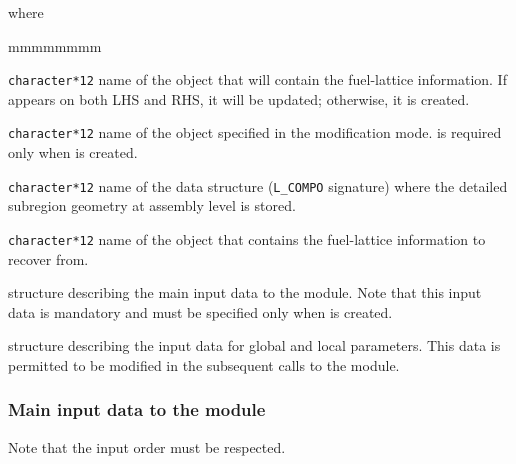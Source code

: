 \noindent where
\begin{ListeDeDescription}{mmmmmmmm}

\item[\dusa{FLMAP}] \texttt{character*12} name of the  object
that will contain the fuel-lattice information. If  appears on
both LHS and RHS, it will be updated; otherwise, it is created.

\item[\dusa{MATEX}] \texttt{character*12} name of the  object
specified in the modification mode.  is required
only when  is created.

\item[\dusa{COMPO}] {\tt character*12} name of the  data
structure ({\tt L\_COMPO} signature) where the detailed subregion geometry at assembly level is stored.

\item[\dusa{FLMAP2}] \texttt{character*12} name of the  object
that contains the fuel-lattice information to recover from.

\item[\dstr{descresini1}] structure describing the main input data to
the  module. Note that this input data is mandatory and
must be specified only when  is created.

\item[\dstr{descresini2}] structure describing the input data for global
and local parameters. This data is permitted to be modified in the
subsequent calls to the  module.

\end{ListeDeDescription}

\vskip 0.2cm
\subsubsection{Main input data to the  module}\label{sect:resinimain}

\noindent
Note that the input order must be respected.\\

